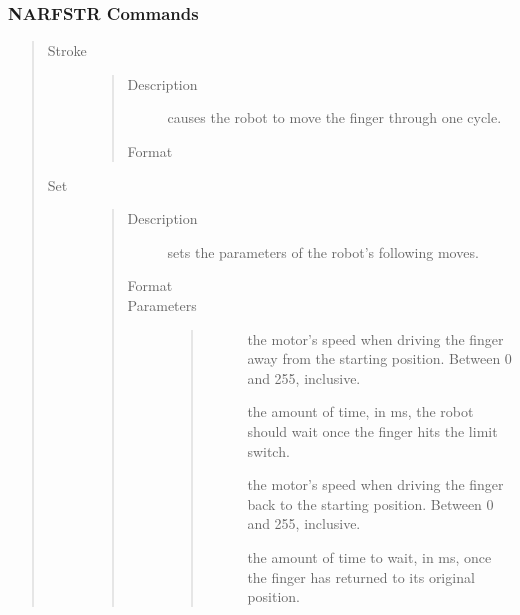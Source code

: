 \documentclass[letterpaper,10pt,english]{sphinxmanual}
\begin{document}
\subsubsection{NARFSTR Commands}
\label{Use:narfstr-commands}\begin{quote}\begin{description}
\item[{Stroke}] \leavevmode\begin{quote}\begin{description}
\item[{Description}] \leavevmode
causes the robot to move the finger through one cycle.

\item[{Format}] \leavevmode
{}

\end{description}\end{quote}

\item[{Set}] \leavevmode\begin{quote}\begin{description}
\item[{Description}] \leavevmode
sets the parameters of the robot's following moves.

\item[{Format}] \leavevmode
{}

\item[{Parameters}] \leavevmode\begin{quote}\begin{description}
\item[{}] \leavevmode
the motor's speed when driving the finger away from the starting position. Between 0 and 255, inclusive.

\item[{}] \leavevmode
the amount of time, in ms, the robot should wait once the finger hits the limit switch.

\item[{}] \leavevmode
the motor's speed when driving the finger back to the starting position. Between 0 and 255, inclusive.

\item[{}] \leavevmode
the amount of time to wait, in ms, once the finger has returned to its original position.

\end{description}\end{quote}


\end{description}
\end{quote}
\end{description}
\end{quote}
\end{document}
